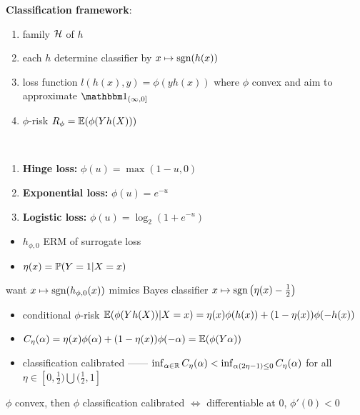 \begin{setting}
    \textbf{Classification framework}:
    \begin{enumerate}
        \item family $\mathcal{H}$ of $h$
        \item each $h$ determine classifier by $x \mapsto \textnormal{sgn}(h(x))$
        \item loss function $l(h(x), y) = \phi(y h(x))$ where $\phi$ convex and aim to approximate $\In_{(\infty, 0]}$
        \item $\phi$-risk $R_\phi = \mathbb{E}(\phi(Y h(X)))$
    \end{enumerate}
\end{setting}

\begin{example}\,
    \begin{enumerate}
        \item \textbf{Hinge loss:} $\phi(u) = \max(1 - u, 0)$
        \item \textbf{Exponential loss:} $\phi(u) = e^{-u}$
        \item \textbf{Logistic loss:} $\phi(u) = \log_2 (1 + e^{-u})$
    \end{enumerate}
\end{example}

\begin{itemize}
    \item $h_{\phi, 0}$ ERM of surrogate loss
    \item $\eta(x) = \mathbb{P}(Y = 1 | X = x)$
\end{itemize}

\begin{idea}
    want $x \mapsto \textnormal{sgn}({h_{\phi, 0}(x)})$ mimics Bayes classifier $x \mapsto \textnormal{sgn}\left(\eta(x) - \frac{1}{2}\right)$
\end{idea}

\begin{itemize}
    \item conditional $\phi$-risk $\mathbb{E}(\phi(Yh(X)) | X = x) = \eta(x) \phi(h(x)) + (1 - \eta(x))\phi(-h(x))$
    \item $C_\eta(\alpha) = \eta(x) \phi(\alpha) + (1 - \eta(x))\phi(-\alpha) = \mathbb{E}(\phi(Y\alpha))$
    \item classification calibrated ------ $\inf_{\alpha \in \mathbb{R}} C_\eta(\alpha) < \inf_{\alpha(2 \eta - 1) \leq 0} C_\eta (\alpha)$ for all $\eta \in [0, \frac{1}{2}) \bigcup (\frac{1}{2}, 1]$
\end{itemize}

\begin{thm}
    $\phi$ convex, then $\phi$ classification calibrated $\iff$ differentiable at $0$, $\phi'(0) < 0$
\end{thm}
\begin{pf}

\end{pf}